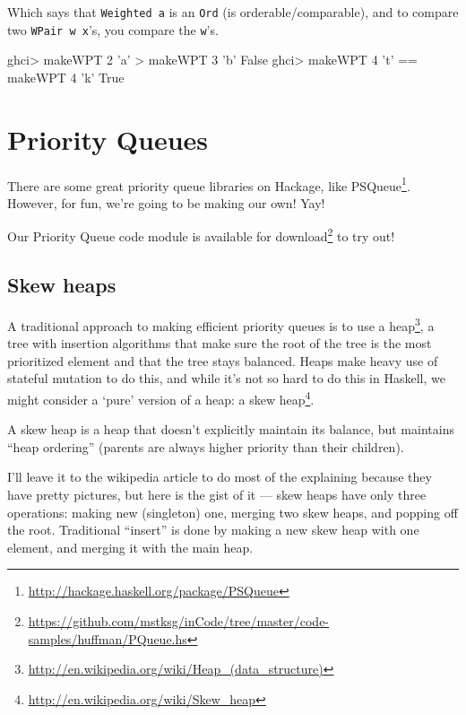 \documentclass[]{article}
\newenvironment{Shaded}{}{}
\newcommand{\DataTypeTok}[1]{\textcolor[rgb]{0.56,0.13,0.00}{{#1}}}
\newcommand{\DecValTok}[1]{\textcolor[rgb]{0.25,0.63,0.44}{{#1}}}
\newcommand{\CharTok}[1]{\textcolor[rgb]{0.25,0.44,0.63}{{#1}}}
\newcommand{\FunctionTok}[1]{\textcolor[rgb]{0.02,0.16,0.49}{{#1}}}
\newcommand{\NormalTok}[1]{{#1}}
\renewcommand{\href}[2]{#2\footnote{\url{#1}}}
\begin{document}
Which says that \texttt{Weighted\ a} is an \texttt{Ord} (is
orderable/comparable), and to compare two \texttt{WPair\ w\ x}'s, you compare
the \texttt{w}'s.

\begin{Shaded}
\begin{Highlighting}[]
\NormalTok{ghci}\FunctionTok{>} \NormalTok{makeWPT }\DecValTok{2} \CharTok{'a'} \FunctionTok{>} \NormalTok{makeWPT }\DecValTok{3} \CharTok{'b'}
\DataTypeTok{False}
\NormalTok{ghci}\FunctionTok{>} \NormalTok{makeWPT }\DecValTok{4} \CharTok{'t'} \FunctionTok{==} \NormalTok{makeWPT }\DecValTok{4} \CharTok{'k'}
\DataTypeTok{True}
\end{Highlighting}
\end{Shaded}

\section{Priority Queues}\label{priority-queues}

There are some great priority queue libraries on Hackage, like
\href{http://hackage.haskell.org/package/PSQueue}{PSQueue}. However, for fun,
we're going to be making our own! Yay!

Our Priority Queue code module is
\href{https://github.com/mstksg/inCode/tree/master/code-samples/huffman/PQueue.hs}{available
for download} to try out!

\subsection{Skew heaps}\label{skew-heaps}

A traditional approach to making efficient priority queues is to use a
\href{http://en.wikipedia.org/wiki/Heap_(data_structure)}{heap}, a tree with
insertion algorithms that make sure the root of the tree is the most prioritized
element and that the tree stays balanced. Heaps make heavy use of stateful
mutation to do this, and while it's not so hard to do this in Haskell, we might
consider a `pure' version of a heap: a
\href{http://en.wikipedia.org/wiki/Skew_heap}{skew heap}.

A skew heap is a heap that doesn't explicitly maintain its balance, but
maintains ``heap ordering'' (parents are always higher priority than their
children).

I'll leave it to the wikipedia article to do most of the explaining because they
have pretty pictures, but here is the gist of it --- skew heaps have only three
operations: making new (singleton) one, merging two skew heaps, and popping off
the root. Traditional ``insert'' is done by making a new skew heap with one
element, and merging it with the main heap.
\end{document}
